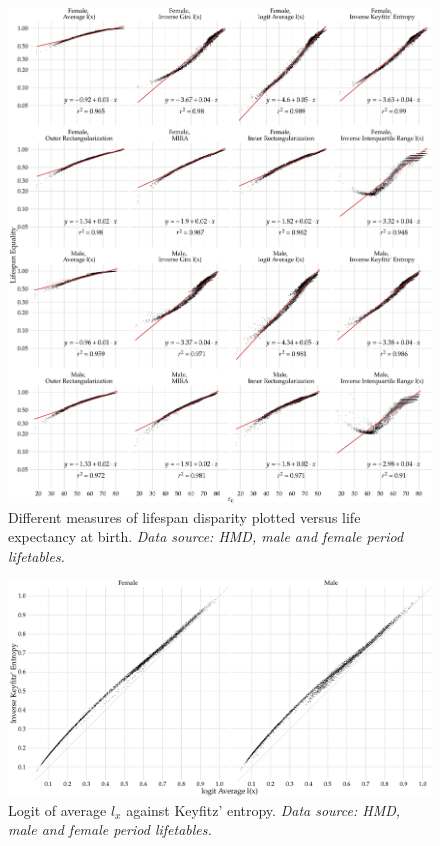 \documentclass[
  10pt
]{scrartcl}
\begin{document}
\begin{figure}[ht!]
  \includegraphics[width = \linewidth]{../out/plot_e0_vs_lx_equality.pdf}
  \caption{Different measures of lifespan disparity plotted versus life expectancy at birth. \emph{Data source: HMD, male and female period lifetables.}}
\end{figure}

\begin{figure}[ht!]
  \includegraphics[width = \linewidth]{../out/plot_logitavglx_vs_keyfentr.pdf}
  \caption{Logit of average $l_x$ against Keyfitz' entropy. \emph{Data source: HMD, male and female period lifetables.}}
\end{figure}
\end{document}
